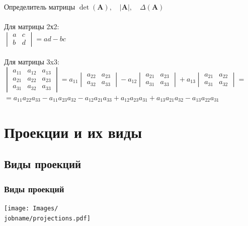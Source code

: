 \documentclass[10pt]{beamer}
\begin{document}
	\begin{frame} {Определитель матрицы}
		$\det(\mathbf A), \quad |\mathbf A|, \quad \Delta(\mathbf A) $ \\ ~ \\
		
		Для матрицы 2х2: \\
		$\begin{vmatrix} a & c \\ b & d \end{vmatrix}=ad-bc$ \\ ~ \\
		Для матрицы 3x3: \\
		$\begin{vmatrix} a_{11} & a_{12} & a_{13} \\ a_{21} & a_{22} & a_{23} \\ a_{31} & a_{32} & a_{33} \end{vmatrix} =
		a_{11}\begin{vmatrix}    a_{22} & a_{23} \\  a_{32} & a_{33} \end{vmatrix}-a_{12}\begin{vmatrix}    a_{21} & a_{23} \\  a_{31} & a_{33} \end{vmatrix}+a_{13}\begin{vmatrix}    a_{21} & a_{22} \\  a_{31} & a_{32} \end{vmatrix} = $\\ 
		$
		= a_{11}a_{22}a_{33} - a_{11}a_{23}a_{32}  - a_{12}a_{21}a_{33}+ a_{12}a_{23}a_{31} + a_{13}a_{21}a_{32} - a_{13}a_{22}a_{31} $
		
		
	\end{frame}
	
	\section{Проекции и их виды}
	
	\frame{\sectionpage}
	\subsection{Виды проекций}
	

	
	
	\begin{frame}
		\frametitle{Виды проекций}
		\texttt{[image: Images/\\jobname/projections.pdf]}
	\end{frame}
	
\end{document}
